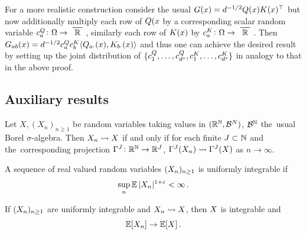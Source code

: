For a more realistic construction consider the usual $G(x) = d^{-1/2} Q(x) K(x)^\top$ but now additionally multiply each row of $Q(x$ by a corresponding scalar random variable $c_a^\querySymbol \colon \Omega \to \xbar{\mathbb{R}}$, similarly each row of $K(x)$ by $c_a^\keySymbol \colon \Omega \to \xbar{\mathbb{R}}$.
Then $G_{ab}(x) = d^{-1/2} c_a^Q c_b^K \langle Q_{a\cdot}(x) , K_{b\cdot}(x) \rangle$ and thus one can achieve the desired result by setting up the joint distribution of $\{ c_1^{Q} , \ldots , c_{d^s}^{Q}, c_{1}^{K}, \ldots , c_{d^s}^{K} \}$ in analogy to that in the above proof.




\subsection{Auxiliary results}

\begin{lemma}[Billingsley, 1986, p. 19]\label{lem:fin_dim_marg}
    Let $X, (X_n)_{n \geq 1}$ be random variables taking values in $(\mathbb{R}^{\mathbb{N}}, \mathcal{B}^N)$, $\mathcal{B}^{\mathbb{N}}$ the~usual Borel $\sigma$-algebra.
    Then $X_n \rightsquigarrow X$ if and only if for each finite $J \subset \mathbb{N}$ and the~corresponding projection $\Gamma^J \colon \mathbb{R}^{\mathbb{N}} \to \mathbb{R}^{J}$, $\Gamma^J (X_n) \rightsquigarrow \Gamma^J (X)$ as $n \to \infty$.
\end{lemma}



\begin{lemma}[Billingsley, 1986, p. 31]\label{lem:sup_ui}
    A sequence of real valued random variables $(X_n)_{n \geq 1}$ is uniformly integrable if 
    $$\sup_{n} \operatorname*{\mathbb{E}} | X_n |^{1 + \varepsilon}  < \infty \, .$$
\end{lemma}



\begin{theorem}\label{thm:mean_convergence}
    If $(X_n)_{n \geq 1}$ are uniformly integrable and $X_{n} \rightsquigarrow X$, then $X$ is integrable and 
    $$\operatorname*{\mathbb{E}} [X_{n}] \to \operatorname*{\mathbb{E}} [X] \, .$$
\end{theorem}

